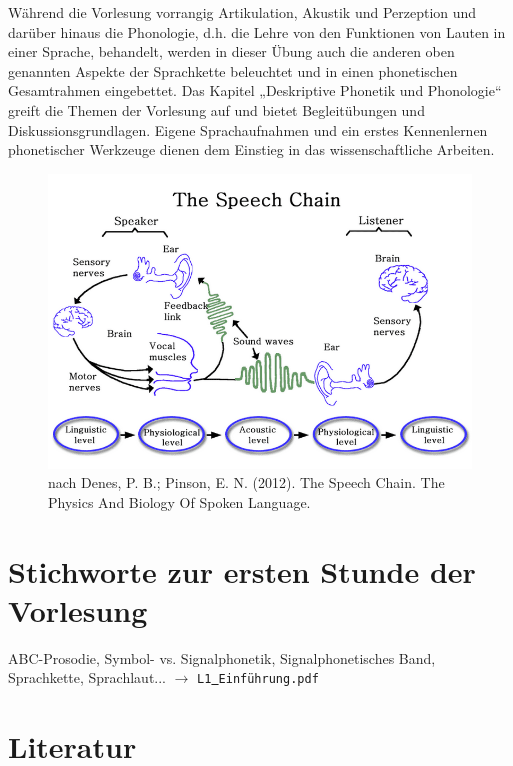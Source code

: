 \documentclass[11pt]{book}
\begin{document}
Während die Vorlesung vorrangig Artikulation, Akustik und Perzeption und darüber hinaus die Phonologie, d.\thinspace h. die Lehre von den Funktionen von Lauten in einer Sprache,  behandelt, werden in dieser Übung auch die anderen oben genannten Aspekte der Sprachkette beleuchtet und in einen phonetischen Gesamtrahmen eingebettet. Das Kapitel „Deskriptive Phonetik und Phonologie“ greift die Themen der Vorlesung auf und bietet Begleitübungen und Diskussionsgrundlagen. Eigene Sprachaufnahmen und ein erstes Kennenlernen phonetischer Werkzeuge dienen dem Einstieg in das wissenschaftliche Arbeiten.


\begin{figure}[htbp]
\begin{center}
\includegraphics[width=\textwidth]{grafiken/allgemeine-einfuehrung/speech-chain}
\caption{nach Denes, P. B.; Pinson, E. N. (2012). The Speech Chain. The Physics And Biology Of Spoken Language.}
\label{fig1}
\end{center}
\end{figure}

\section{Stichworte zur ersten Stunde der Vorlesung} 

ABC-Prosodie,  Symbol- vs. Signalphonetik, Signalphonetisches Band, Sprachkette, Sprachlaut... $\rightarrow$ {\tt L1\underline{\ }Einführung.pdf} 


\section{Literatur}
\end{document}
